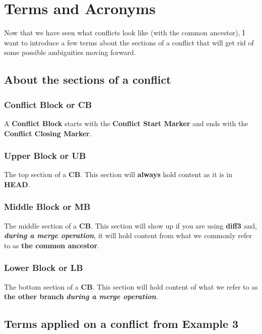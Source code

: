 
\section{Terms and Acronyms}

Now that we have seen what conflicts look like (with the common ancestor), I want to introduce a few terms about
the sections of a conflict that will get rid of some possible ambiguities moving forward.

\subsection{About the sections of a conflict}

\subsubsection{Conflict Block or CB}
A {\bf Conflict Block} starts with the {\bf Conflict Start Marker} and ends with the {\bf Conflict Closing Marker}.

\subsubsection{Upper Block or UB}
The top section of a {\bf CB}. This section will {\bf always} hold content as it is in {\bf HEAD}.

\subsubsection{Middle Block or MB}
The middle section of a {\bf CB}. This section will show up if you are using {\bf diff3} and,
{\bf\it during a merge operation}, it will hold content from what we commonly refer to as {\bf the common ancestor}.

\subsubsection{Lower Block or LB}
The bottom section of a {\bf CB}. This section will hold content of what we refer to as {\bf the other branch}
{\bf\it during a merge operation}.

\subsection{Terms applied on a conflict from Example 3}

